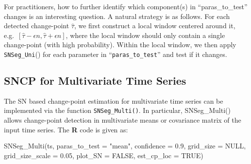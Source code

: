 



{
For practitioners, how to further identify which component(s) in “paras\_to\_test”
changes is an interesting question. A natural strategy is as follows. For each detected change-point $\hat{\tau}$, we first construct a local window centered around it, e.g.\ $[\hat{\tau}-\epsilon n,\hat{\tau}+\epsilon n]$, where the local window should only contain a single change-point (with high probability). Within the local window, we then apply \texttt{SNSeg\_Uni}() for each parameter in “\texttt{paras\_to\_test}” and test if it changes.
}

\subsection{SNCP for Multivariate Time Series}\label{subsec:SNSegMulti}

The SN based change-point estimation for multivariate time series can be implemented via the function \texttt{SNSeg\_Multi()}. In particular, SNSeg\_Multi() allows change-point detection in multivariate means or covariance matrix of the input time series. The \textbf{R} code is given as:
\begin{example}
SNSeg_Multi(ts, paras_to_test = "mean", confidence = 0.9, grid_size = NULL, 
            grid_size_scale = 0.05, plot_SN = FALSE, est_cp_loc = TRUE)
\end{example}

